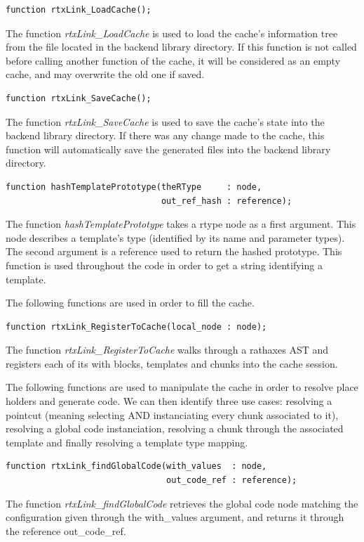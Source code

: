 \documentclass[american]{rtxreport}
\begin{document}
\begin{lstlisting}
function rtxLink_LoadCache();
\end{lstlisting}
The function \emph{rtxLink\_LoadCache} is used to load the cache's information
tree from the file located in the backend library directory. If this function
is not called before calling another function of the cache, it will be
considered as an empty cache, and may overwrite the old one if saved.

\begin{lstlisting}
function rtxLink_SaveCache();
\end{lstlisting}
The function \emph{rtxLink\_SaveCache} is used to save the cache's state into
the backend library directory. If there was any change made to the cache, this
function will automatically save the generated files into the backend library
directory.

\begin{lstlisting}
function hashTemplatePrototype(theRType     : node,
                               out_ref_hash : reference);
\end{lstlisting}
The function \emph{hashTemplatePrototype} takes a rtype node as a first
argument.  This node describes a template's type (identified by its name and
parameter types). The second argument is a reference used to return the hashed
prototype.  This function is used throughout the code in order to get a string
identifying a template.

\vspace{20pt}

The following functions are used in order to fill the cache.

\begin{lstlisting}
function rtxLink_RegisterToCache(local_node : node);
\end{lstlisting}
The function \emph{rtxLink\_RegisterToCache} walks through a rathaxes AST and
registers each of its with blocks, templates and chunks into the cache session.

\vspace{20pt}

The following functions are used to manipulate the cache in order to resolve
place holders and generate code. We can then identify three use cases:
resolving a pointcut (meaning selecting AND instanciating every chunk
associated to it), resolving a global code instanciation, resolving a chunk
through the associated template and finally resolving a template type mapping.

\begin{lstlisting}
function rtxLink_findGlobalCode(with_values  : node,
                                out_code_ref : reference);
\end{lstlisting}
The function \emph{rtxLink\_findGlobalCode} retrieves the global code node
matching the configuration given through the with\_values argument, and returns
it through the reference out\_code\_ref.
\end{document}
